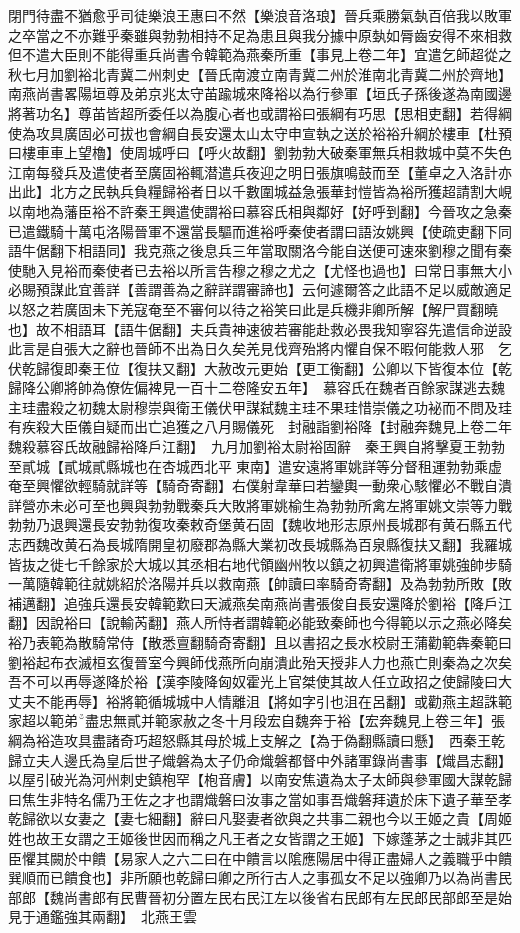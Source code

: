 閉門待盡不猶愈乎司徒樂浪王惠曰不然【樂浪音洛琅】晉兵乘勝氣埶百倍我以敗軍之卒當之不亦難乎秦雖與勃勃相持不足為患且與我分據中原埶如脣齒安得不來相救但不遣大臣則不能得重兵尚書令韓範為燕秦所重【事見上卷二年】宜遣乞師超從之秋七月加劉裕北青冀二州刺史【晉氏南渡立南青冀二州於淮南北青冀二州於齊地】南燕尚書畧陽垣尊及弟京兆太守苖踰城來降裕以為行參軍【垣氏子孫後遂為南國邊將著功名】尊苖皆超所委任以為腹心者也或謂裕曰張綱有巧思【思相吏翻】若得綱使為攻具廣固必可拔也會綱自長安還太山太守申宣執之送於裕裕升綱於樓車【杜預曰樓車車上望櫓】使周城呼曰【呼火故翻】劉勃勃大破秦軍無兵相救城中莫不失色江南每發兵及遣使者至廣固裕輒潜遣兵夜迎之明日張旗鳴鼓而至【董卓之入洛計亦出此】北方之民執兵負糧歸裕者日以千數圍城益急張華封愷皆為裕所獲超請割大峴以南地為藩臣裕不許秦王興遣使謂裕曰慕容氏相與鄰好【好呼到翻】今晉攻之急秦已遣鐵騎十萬屯洛陽晉軍不還當長驅而進裕呼秦使者謂曰語汝姚興【使疏吏翻下同語牛倨翻下相語同】我克燕之後息兵三年當取關洛今能自送便可速來劉穆之聞有秦使馳入見裕而秦使者已去裕以所言告穆之穆之尤之【尤怪也過也】曰常日事無大小必賜預謀此宜善詳【善謂善為之辭詳謂審諦也】云何遽爾答之此語不足以威敵適足以怒之若廣固未下羌寇奄至不審何以待之裕笑曰此是兵機非卿所解【解尸買翻曉也】故不相語耳【語牛倨翻】夫兵貴神速彼若審能赴救必畏我知寧容先遣信命逆設此言是自張大之辭也晉師不出為日久矣羌見伐齊殆將内懼自保不暇何能救人邪　乞伏乾歸復即秦王位【復扶又翻】大赦改元更始【更工衡翻】公卿以下皆復本位【乾歸降公卿將帥為僚佐偏裨見一百十二卷隆安五年】　慕容氏在魏者百餘家謀逃去魏主珪盡殺之初魏太尉穆崇與衛王儀伏甲謀弑魏主珪不果珪惜崇儀之功袐而不問及珪有疾殺大臣儀自疑而出亡追獲之八月賜儀死　封融詣劉裕降【封融奔魏見上卷二年魏殺慕容氏故融歸裕降戶江翻】　九月加劉裕太尉裕固辭　秦王興自將擊夏王勃勃至貳城【貳城貳縣城也在杏城西北平東南】遣安遠將軍姚詳等分督租運勃勃乘虚奄至興懼欲輕騎就詳等【騎奇寄翻】右僕射韋華曰若鑾輿一動衆心駭懼必不戰自潰詳營亦未必可至也興與勃勃戰秦兵大敗將軍姚榆生為勃勃所禽左將軍姚文崇等力戰勃勃乃退興還長安勃勃復攻秦敕奇堡黄石固【魏收地形志原州長城郡有黄石縣五代志西魏改黄石為長城隋開皇初廢郡為縣大業初改長城縣為百泉縣復扶又翻】我羅城皆抜之徙七千餘家於大城以其丞相右地代領幽州牧以鎮之初興遣衛將軍姚強帥步騎一萬隨韓範往就姚紹於洛陽并兵以救南燕【帥讀曰率騎奇寄翻】及為勃勃所敗【敗補邁翻】追強兵還長安韓範歎曰天滅燕矣南燕尚書張俊自長安還降於劉裕【降戶江翻】因說裕曰【說輸芮翻】燕人所恃者謂韓範必能致秦師也今得範以示之燕必降矣裕乃表範為散騎常侍【散悉亶翻騎奇寄翻】且以書招之長水校尉王蒲勸範犇秦範曰劉裕起布衣滅桓玄復晉室今興師伐燕所向崩潰此殆天授非人力也燕亡則秦為之次矣吾不可以再辱遂降於裕【漢李陵降匈奴霍光上官桀使其故人任立政招之使歸陵曰大丈夫不能再辱】裕將範循城城中人情離沮【將如字引也沮在呂翻】或勸燕主超誅範家超以範弟盡忠無貳并範家赦之冬十月段宏自魏奔于裕【宏奔魏見上卷三年】張綱為裕造攻具盡諸奇巧超怒縣其母於城上支解之【為于偽翻縣讀曰懸】　西秦王乾歸立夫人邊氏為皇后世子熾磐為太子仍命熾磐都督中外諸軍錄尚書事【熾昌志翻】以屋引破光為河州刺史鎮枹罕【枹音膚】以南安焦遺為太子太師與參軍國大謀乾歸曰焦生非特名儒乃王佐之才也謂熾磐曰汝事之當如事吾熾磐拜遺於床下遺子華至孝乾歸欲以女妻之【妻七細翻】辭曰凡娶妻者欲與之共事二親也今以王姬之貴【周姬姓也故王女謂之王姬後世因而稱之凡王者之女皆謂之王姬】下嫁蓬茅之士誠非其匹臣懼其闕於中饋【易家人之六二曰在中饋言以隂應陽居中得正盡婦人之義職乎中饋巽順而已饋食也】非所願也乾歸曰卿之所行古人之事孤女不足以強卿乃以為尚書民部郎【魏尚書郎有民曹晉初分置左民右民江左以後省右民郎有左民郎民部郎至是始見于通鑑強其兩翻】　北燕王雲